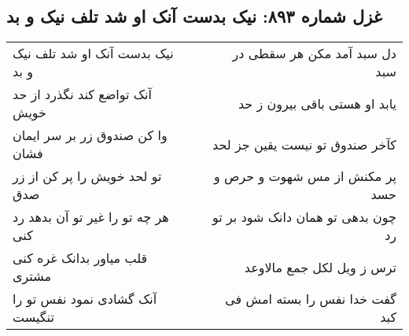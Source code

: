 \begin{center}
\section*{غزل شماره ۸۹۳: نیک بدست آنک او شد تلف نیک و بد}
\label{sec:0893}
\begin{longtable}{l p{0.5cm} r}
نیک بدست آنک او شد تلف نیک و بد
&&
دل سبد آمد مکن هر سقطی در سبد
\\
آنک تواضع کند نگذرد از حد خویش
&&
یابد او هستی باقی بیرون ز حد
\\
وا کن صندوق زر بر سر ایمان فشان
&&
کآخر صندوق تو نیست یقین جز لحد
\\
تو لحد خویش را پر کن از زر صدق
&&
پر مکنش از مس شهوت و حرص و حسد
\\
هر چه تو را غیر تو آن بدهد رد کنی
&&
چون بدهی تو همان دانک شود بر تو رد
\\
قلب میاور بدانک غره کنی مشتری
&&
ترس ز ویل لکل جمع مالاوعد
\\
آنک گشادی نمود نفس تو را تنگیست
&&
گفت خدا نفس را بسته امش فی کبد
\\
\end{longtable}
\end{center}

